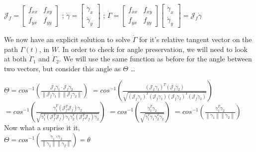 \documentclass[a4paper,man,natbib]{apa6}
\begin{document}
\begin{center}

      $ \mathcal{J}_f = \begin{bmatrix}
        f_{xx} & f_{xy}\\
        f_{yx} & f_{yy}
        \end{bmatrix} $ ; 
      $ \dot{\gamma} = \begin{bmatrix}
        \dot{\gamma}_x\\
        \dot{\gamma}_y
        \end{bmatrix} $ ;   
      $ \dot{\Gamma} = \begin{bmatrix}
        f_{xx} & f_{xy}\\
        f_{yx} & f_{yy}
        \end{bmatrix}
        \begin{bmatrix}
        \dot{\gamma}_x\\
        \dot{\gamma}_y
        \end{bmatrix} 
        = \mathcal{J}_f\dot{\gamma}$
      
\end{center}

We now have an explicit solution to solve $ \dot{\Gamma} $ for it's relative tangent vector on the path $ \Gamma(t) $, in $ W $.
In order to check for angle preservation, we will need to look at both $ \dot{\Gamma}_1 $ and $ \dot{\Gamma}_2 $.
We will use the same function as before for the angle between two vectors, but consider this angle as $ \Theta $ \dots

\begin{center}

      $ \Theta = cos^{-1}(\frac{\mathcal{J}_f\dot{\gamma}_1 \cdot \mathcal{J}_f\dot{\gamma}_2}{{\left\lVert \mathcal{J}_f\dot{\gamma}_1 \right\rVert \left\lVert \mathcal{J}_f\dot{\gamma}_2  \right\rVert }}) $
      $ = cos^{-1}(\frac{(\mathcal{J}_f\dot{\gamma}_1)^T(\mathcal{J}_f\dot{\gamma}_2)}{\sqrt{{(\mathcal{J}_f\dot{\gamma}_1)^T(\mathcal{J}_f\dot{\gamma}_1)(\mathcal{J}_f\dot{\gamma}_2)^T(\mathcal{J}_f\dot{\gamma}_2)}}})$
      $ = cos^{-1}(\frac{\dot{\gamma}_1^T(\mathcal{J}_f^T\mathcal{J}_f)\dot{\gamma}_2}{\sqrt{\dot{\gamma}_1^T(\mathcal{J}_f^T\mathcal{J}_f)\dot{\gamma}_1\dot{\gamma}_2^T(\mathcal{J}_f^T\mathcal{J}_f)\dot{\gamma}_2}})$
      $ = cos^{-1}(\frac{\dot{\gamma}_1^T\dot{\gamma}_2}{\sqrt{\dot{\gamma}_1^T\dot{\gamma}_1\dot{\gamma}_2^T\dot{\gamma}_2}})$
      $ = cos^{-1}(\frac{\dot{\gamma}_1^T\dot{\gamma}_2}{\left\lVert \dot{\gamma}_1 \right\rVert \left\lVert \dot{\gamma}_2  \right\rVert })$ \\
      Now what a suprise it it, \\
      $ \Theta = cos^{-1}(\frac{\dot{\gamma}_1  \cdot \dot{\gamma}_2 }{\left\lVert \dot{\gamma}_1 \right\rVert \left\lVert \dot{\gamma}_2  \right\rVert }) = \theta $
      
\end{center}
\end{document}
